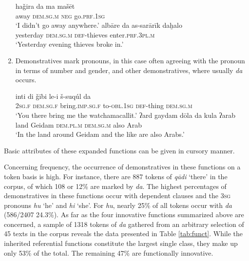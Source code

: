 \documentclass[output=paper]{langsci/langscibook}
\begin{document}
\begin{enumerate}[leftmargin=*]
\ea\label{hajira}
\gll haǧira da ma mašēt\\
     away \textsc{dem.sg.m} \textsc{neg} go.\textsc{prf.1sg}\\
\glt ‘I didn’t go away anywhere.’
\ex\label{albare}
\gll albāre da as-sarārīk daḫalo\\
     yesterday \textsc{dem.sg.m} \textsc{def-}thieves enter.\textsc{prf.3pl.m}\\
\glt ‘Yesterday evening thieves broke in.’
\z

\item Demonstratives mark pronouns, in this case often agreeing with the pronoun in terms of number and {gender}, and other {demonstratives}, where usually \textit{da} occurs.

\ea\label{suqul}
\ea
\gll inti di ǧībi le-i š-suqúl da\\
     \textsc{2sg.f} \textsc{dem.sg.f} bring.\textsc{imp.sg.f} to-\textsc{obl.1sg} \textsc{def-}thing \textsc{dem.sg.m}\\
\glt ‘You there bring me the watchamacallit.’
\ex \label{ard}
\gll ʔard gaydam dōla da kula ʔarab\\
     land Geidam \textsc{dem.pl.m} \textsc{dem.sg.m} also Arab\\
\glt ‘In the land around Geidam and the like are also Arabs.’
\z
\z

\end{enumerate}

\noindent Basic attributes of these expanded functions can be given in cursory manner.

Concerning {frequency}, the occurrence of {demonstratives} in these functions on a token basis is high. For instance, there are 887 tokens of \textit{qādi} ‘there’ in the corpus, of which 108 or 12\% are marked by \textit{da}. The highest percentages of {demonstratives} in these functions occur with dependent clauses and the 3\textsc{sg} pronouns \textit{hu} ‘he’ and \textit{hi} ‘she’. For \textit{hu}, nearly 25\% of all tokens occur with \textit{da} (586/2407 24.3\%). As far as the four innovative functions summarized above are concerned, a sample of 1318 tokens of \textit{da} gathered from an arbitrary selection of 45 texts in the corpus reveals the data presented in Table \ref{tab:funct}. While the inherited referential functions constitute the largest single class, they make up only 53\% of the total. The remaining 47\% are functionally innovative.
\end{document}
